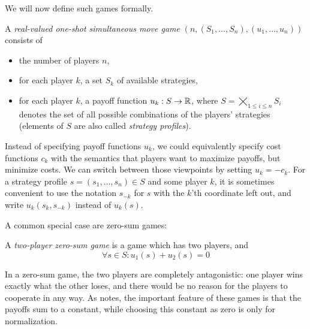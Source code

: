 \documentclass[a4paper]{scrreprt}
\begin{document}
    We will now define such games formally.

    \begin{defn}
        A \emph{real-valued one-shot simultaneous move game} $(n, (S_1, \dots, S_n), (u_1, \dots, u_n))$ consists of 
        \begin{itemize}
            \item the number of players $n$,
            \item for each player $k$, a set $S_k$ of available strategies,
            \item for each player $k$, a payoff function $u_k: S \to \mathbb{R}$, where $S = \bigtimes\limits_{1\leq i \leq n} S_i$ denotes the set of all possible combinations of the players' strategies (elements of $S$ are also called \emph{strategy profiles}). 
        \end{itemize}
        \label{defn:realValuedGames}
    \end{defn}
    
    Instead of specifying payoff functions $u_k$, we could equivalently specify cost functions $c_k$ with the semantics that players want to maximize payoffs, but minimize costs. We can switch between those viewpoints by setting $u_k = - c_k$. For a strategy profile $s = (s_1, \dots, s_n) \in S$ and some player $k$, it is sometimes convenient to use the notation $s_{-k}$ for $s$ with the $k$'th coordinate left out, and write $u_k(s_k, s_{-k})$ instead of $u_k(s)$.
    
    A common special case are zero-sum games:
    
    \begin{defn}
        A \emph{two-player zero-sum game} is a game which has two players, and 
        \[ \forall s \in S: u_1(s) + u_2(s) = 0 \]
    \end{defn}

    In a zero-sum game, the two players are completely antagonistic: %
    one player wins exactly what the other loses, and there would be no reason for the players to cooperate in any way. As \cite{bib:fudenbergGameTheory} notes, the important feature of these games is that the payoffs sum to a constant, while choosing this constant as zero is only for normalization.
    
\end{document}
